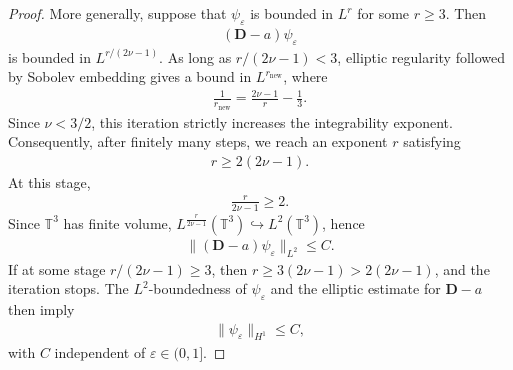 \documentclass[10pt,a4paper]{amsart}
\newcommand{\T}{\mathbb{T}}
\newcommand{\eps}{\varepsilon}
\newcommand{\pD}{\mathbf{D}}
\begin{document}
\begin{proof}
More generally, suppose that $\psi_\eps$ is bounded in $L^r$ for
some $r\ge3$. Then
\begin{align}
(\pD-a)\psi_\eps
\end{align}
is bounded in $L^{r/(2\nu-1)}$. As long as
$r/(2\nu-1)<3$, elliptic regularity followed by Sobolev embedding gives a
bound in $L^{r_{\mathrm{new}}}$, where
\begin{align}
\frac1{r_{\mathrm{new}}}
=
\frac{2\nu-1}{r}-\frac13.
\end{align}
Since $\nu<3/2$, this iteration strictly increases the integrability
exponent. Consequently, after finitely many steps, we reach an exponent
$r$ satisfying
\begin{align}
r\ge 2(2\nu-1).
\end{align}
At this stage,
\begin{align}
\frac{r}{2\nu-1}\ge2.
\end{align}
Since $\T^3$ has finite volume, $L^\frac{r}{2\nu-1}(\T^3)\hookrightarrow L^2(\T^3)$, hence
\begin{align}
\|(\pD-a)\psi_\eps\|_{L^2}\le C.
\end{align}
If at some stage $r/(2\nu-1)\ge3$, then $r\ge3(2\nu-1)>2(2\nu-1)$, and the iteration stops. The $L^2$-boundedness of $\psi_\eps$ and the elliptic estimate for
$\pD-a$ then imply
\begin{align}
\|\psi_\eps\|_{H^1}\le C,
\end{align}
with $C$ independent of $\eps\in(0,1]$.

\end{proof}
\end{document}
